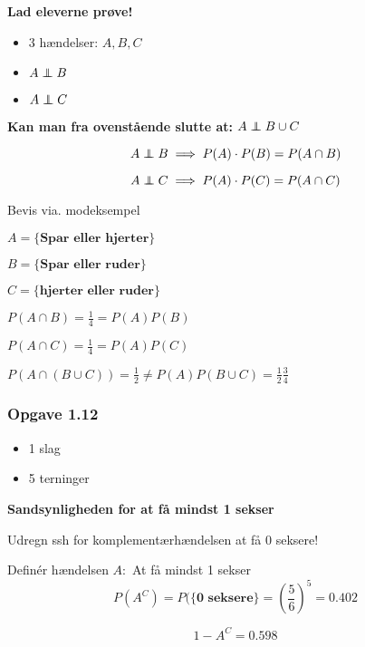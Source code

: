 \textbf{Lad eleverne prøve!}

\begin{itemize}
    \item 3 hændelser: $A, B, C$
    \item $A \independent B$
    \item $A \independent C$
\end{itemize}

\textbf{Kan man fra ovenstående slutte at: 
 $A \independent B \cup C$}

\begin{equation}
    A \independent B \implies P(A)\cdot P(B) = P(A \cap B)
\end{equation}

\begin{equation}
    A \independent C \implies P(A)\cdot P(C) = P(A \cap C)
\end{equation}

Bevis via. modeksempel

$A = \{\textbf{Spar eller hjerter} \}$

$ B = \{\textbf{Spar eller ruder}\}$

$C = \{\textbf{hjerter eller ruder}\}$

$P(A\cap B) = \frac{1}{4} = P(A) P(B)$

$P(A \cap C) = \frac{1}{4} = P(A)P(C)$

$P(A \cap (B \cup C)) = \frac{1}{2} \neq P(A)P(B \cup C) = \frac{1}{2}\frac{3}{4}$

\subsubsection{Opgave 1.12}

\begin{itemize}
    \item 1 slag
    \item 5 terninger
\end{itemize}

\textbf{Sandsynligheden for at få mindst 1 sekser}

Udregn ssh for komplementærhændelsen at få 0 seksere!

Definér hændelsen $A:$ At få mindst 1 sekser
\begin{equation}
    P(A^C) = P(\{\textbf{0 seksere}\} = \left( \frac{5}{6} \right)^5 = 0.402
\end{equation}

\begin{equation}
    1 - A^C = 0.598
\end{equation}